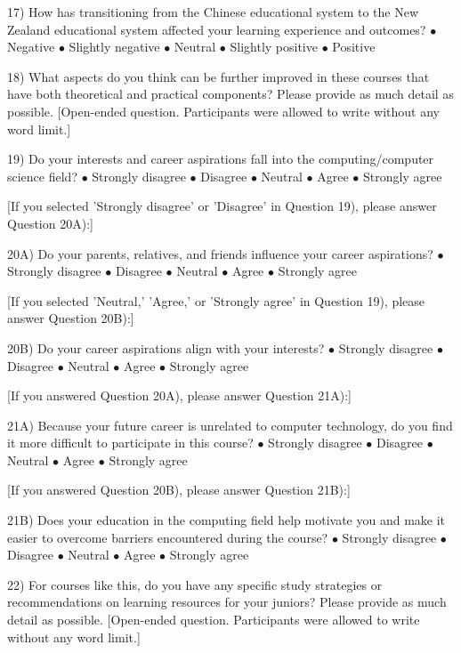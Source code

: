 \documentclass{article}
\begin{document}
17) How has transitioning from the Chinese educational system to the New Zealand educational system affected your learning experience and outcomes?
$\bullet $ Negative $\bullet $ Slightly negative $\bullet $ Neutral $\bullet $ Slightly positive $\bullet $ Positive

18) What aspects do you think can be further improved in these courses that have both theoretical and practical components? Please provide as much detail as possible. [Open-ended question. Participants were allowed to write without any word limit.]

19) Do your interests and career aspirations fall into the computing/computer science field?
$\bullet $ Strongly disagree $\bullet $ Disagree $\bullet $ Neutral $\bullet $ Agree $\bullet $ Strongly agree

[If you selected 'Strongly disagree' or 'Disagree' in Question 19), please answer Question 20A):]

20A) Do your parents, relatives, and friends influence your career aspirations?
$\bullet $ Strongly disagree $\bullet $ Disagree $\bullet $ Neutral $\bullet $ Agree $\bullet $ Strongly agree

[If you selected 'Neutral,' 'Agree,' or 'Strongly agree' in Question 19), please answer Question 20B):]

20B) Do your career aspirations align with your interests?
$\bullet $ Strongly disagree $\bullet $ Disagree $\bullet $ Neutral $\bullet $ Agree $\bullet $ Strongly agree

[If you answered Question 20A), please answer Question 21A):]

21A) Because your future career is unrelated to computer technology, do you find it more difficult to participate in this course?
$\bullet $ Strongly disagree $\bullet $ Disagree $\bullet $ Neutral $\bullet $ Agree $\bullet $ Strongly agree

[If you answered Question 20B), please answer Question 21B):]

21B) Does your education in the computing field help motivate you and make it easier to overcome barriers encountered during the course?
$\bullet $ Strongly disagree $\bullet $ Disagree $\bullet $ Neutral $\bullet $ Agree $\bullet $ Strongly agree

22) For courses like this, do you have any specific study strategies or recommendations on learning resources for your juniors? Please provide as much detail as possible. [Open-ended question. Participants were allowed to write without any word limit.]
\end{document}
